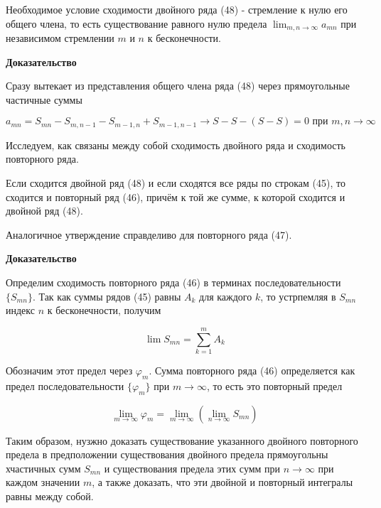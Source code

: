 \begin{statm}
	Необходимое условие сходимости двойного ряда (48) - стремление к нулю его общего члена, то есть существование равного нулю предела $\displaystyle\lim_{m, n \rightarrow \infty} a_{mn}$ при независимом стремлении $m$ и $n$ к бесконечности.
\end{statm}
\textbf{Доказательство}

Сразу вытекает из представления общего члена ряда (48) через прямоугольные частичные суммы

\begin{equation*}
	a_{mn} = S_{mn} - S_{m, n-1} - S_{m-1, n} + S_{m-1, n-1} \rightarrow S - S - (S - S) = 0 \mbox{ при } m,n \rightarrow \infty
\end{equation*}

Исследуем, как связаны между собой сходимость двойного ряда и сходимость повторного ряда.

\begin{theorem}
	Если сходится двойной ряд (48) и если сходятся все ряды по строкам (45), то сходится и повторный ряд (46), причём к той же сумме, к которой сходится и двойной ряд (48).
	
	Аналогичное утверждение справделиво для повторного ряда (47).
\end{theorem}
\textbf{Доказательство}

Определим сходимость повторного ряда (46) в терминах последовательности $\{S_{mn}\}$. Так как суммы рядов (45) равны $A_k$ для каждого $k$, то устрпемляя в $S_{mn}$ индекс $n$ к бесконечности, получим

\begin{equation*}
	\displaystyle\lim S_{mn} = \displaystyle\sum_{k  =1}^m A_k
\end{equation*}

Обозначим этот предел через $\varphi_m$. Сумма повторного ряда (46) определяется как предел последовательности $\{\varphi_m\}$ при $m \rightarrow \infty$, то есть это повторный предел

\begin{equation*}
	\displaystyle\lim_{m \rightarrow \infty} \varphi_m = \displaystyle\lim_{m \rightarrow \infty} \left( \displaystyle\lim_{n \rightarrow \infty} S_{mn} \right)
\end{equation*}

Таким образом, нузжно доказать существование указанного двойного повторного предела в предположении существования двойного предела прямоугольны хчастичных сумм $S_{mn}$ и существования предела этих сумм при $n \rightarrow \infty$ при каждом значении $m$, а также доказать, что эти двойной и повторный интегралы равны между собой.

